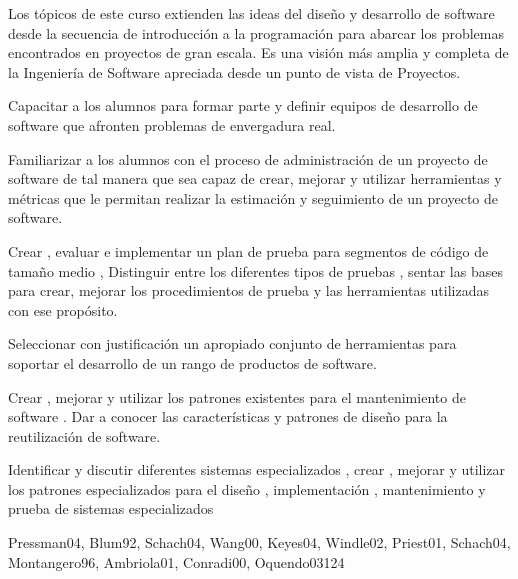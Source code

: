\begin{syllabus}


\begin{justification}
Los tópicos de este curso extienden las ideas del diseño y desarrollo de software desde la secuencia de introducción a la programación para
abarcar los problemas encontrados en proyectos de gran escala. Es una visión más amplia y completa de la Ingeniería
de Software apreciada desde un punto de vista de Proyectos.
\end{justification}

\begin{goals}
\item Capacitar a los alumnos para formar parte y definir equipos de desarrollo de software que afronten problemas de envergadura real.
\item Familiarizar a los alumnos con el proceso de administración de un proyecto de software de tal manera que sea capaz de crear, mejorar y utilizar herramientas y métricas que le permitan realizar la estimación y seguimiento de un proyecto de software.
\item Crear ,  evaluar e implementar un plan de prueba para segmentos de código de tamaño medio  , Distinguir entre los diferentes tipos de pruebas ,  sentar las bases para  crear, mejorar los procedimientos de prueba y las herramientas utilizadas con ese propósito.
\item Seleccionar con justificación un apropiado conjunto de herramientas para soportar el desarrollo de un rango de productos de software.
\item Crear , mejorar y utilizar  los patrones existentes para el mantenimiento de software . Dar a conocer las características y patrones de diseño para la reutilización de software.
\item Identificar y discutir diferentes sistemas especializados , crear , mejorar y utilizar los patrones especializados para el diseño , implementación , mantenimiento y prueba   de sistemas especializados
\end{goals}

\begin{outcomes}
\end{outcomes}

\begin{unit}{\SESpecializedSystemsDef}{Pressman04, Blum92, Schach04, Wang00, Keyes04, Windle02, Priest01, Schach04, Montangero96, Ambriola01, Conradi00, Oquendo03}{12}{4}
   \SESpecializedSystemsAllTopics
   \SESpecializedSystemsAllObjectives
\end{unit}


\end{syllabus}
